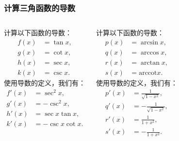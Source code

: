 \documentclass[
10pt,
aspectratio=43,
]{beamer}
\begin{document}
\begin{frame}
	\frametitle{计算三角函数的导数}
	\begin{columns}
		\centering
		计算以下函数的导数：
		\begin{align*}
			f(x) & = \tan x, \\
			g(x) & = \cot x, \\
			h(x) & = \sec x, \\
			k(x) & = \csc x.
		\end{align*}
		\pause
		使用导数的定义，我们有：
		\begin{align*}
			f'(x) & = \sec^2 x,       \\
			g'(x) & = -\csc^2 x,      \\
			h'(x) & = \sec x \tan x,  \\
			k'(x) & = -\csc x \cot x.
		\end{align*}

		\centering
		\pause
		计算以下函数的导数：
		\begin{align*}
			p(x) & = \arcsin x,       \\
			q(x) & = \arccos x,       \\
			r(x) & = \arctan x,       \\
			s(x) & = \text{arccot} x.
		\end{align*}
		\pause
		使用导数的定义，我们有：
		\begin{align*}
			p'(x) & = \frac{1}{\sqrt{1-x^2}},  \\
			q'(x) & = -\frac{1}{\sqrt{1-x^2}}, \\
			r'(x) & = \frac{1}{1+x^2},         \\
			s'(x) & = -\frac{1}{1+x^2}.
		\end{align*}
	\end{columns}
\end{frame}
\end{document}
